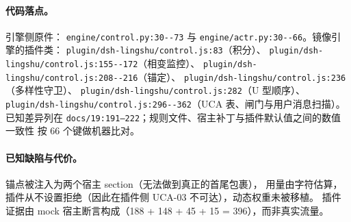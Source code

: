 \paragraph{代码落点。} 引擎侧原件：
\texttt{engine/\allowbreak{}control.\allowbreak{}py:\allowbreak{}30-\allowbreak{}-\allowbreak{}73} 与 \texttt{engine/\allowbreak{}actr.\allowbreak{}py:\allowbreak{}30-\allowbreak{}-\allowbreak{}66}。镜像引擎的插件类：
\texttt{plugin/\allowbreak{}dsh-\allowbreak{}lingshu/\allowbreak{}control.\allowbreak{}js:\allowbreak{}83}（积分）、
\texttt{plugin/\allowbreak{}dsh-\allowbreak{}lingshu/\allowbreak{}control.\allowbreak{}js:\allowbreak{}155-\allowbreak{}-\allowbreak{}172}（相变监控）、
\texttt{plugin/\allowbreak{}dsh-\allowbreak{}lingshu/\allowbreak{}control.\allowbreak{}js:\allowbreak{}208-\allowbreak{}-\allowbreak{}216}（锚定）、
\texttt{plugin/\allowbreak{}dsh-\allowbreak{}lingshu/\allowbreak{}control.\allowbreak{}js:\allowbreak{}236}（多样性守卫）、
\texttt{plugin/\allowbreak{}dsh-\allowbreak{}lingshu/\allowbreak{}control.\allowbreak{}js:\allowbreak{}282}（U 型顺序）、
\texttt{plugin/\allowbreak{}dsh-\allowbreak{}lingshu/\allowbreak{}control.\allowbreak{}js:\allowbreak{}296-\allowbreak{}-\allowbreak{}362}（UCA 表、闸门与用户消息扫描）。
已知差异列在 \texttt{docs/19:191--222}；规则文件、宿主补丁与插件默认值之间的数值一致性
按 66 个键做机器比对。

\paragraph{已知缺陷与代价。} 锚点被注入为两个宿主 section（无法做到真正的首尾包裹），
用量由字符估算，插件从不设置拒绝（因此在插件侧 UCA-03 不可达），动态权重未被移植。
插件证据由 mock 宿主断言构成（188 + 148 + 45 + 15 = 396），而非真实流量。
